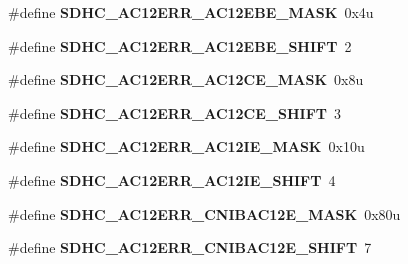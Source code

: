 \begin{DoxyCompactItemize}
\item 
\#define {\bfseries S\+D\+H\+C\+\_\+\+A\+C12\+E\+R\+R\+\_\+\+A\+C12\+E\+B\+E\+\_\+\+M\+A\+SK}~0x4u\hypertarget{group__SDHC__Register__Masks_ga20a7d6558b259a61499a0745f6450798}{}\label{group__SDHC__Register__Masks_ga20a7d6558b259a61499a0745f6450798}

\item 
\#define {\bfseries S\+D\+H\+C\+\_\+\+A\+C12\+E\+R\+R\+\_\+\+A\+C12\+E\+B\+E\+\_\+\+S\+H\+I\+FT}~2\hypertarget{group__SDHC__Register__Masks_gaa4872fca1b2f1ae350fcb6297e995469}{}\label{group__SDHC__Register__Masks_gaa4872fca1b2f1ae350fcb6297e995469}

\item 
\#define {\bfseries S\+D\+H\+C\+\_\+\+A\+C12\+E\+R\+R\+\_\+\+A\+C12\+C\+E\+\_\+\+M\+A\+SK}~0x8u\hypertarget{group__SDHC__Register__Masks_gabefbec3e963ccb70de1fdc5b0bb06c14}{}\label{group__SDHC__Register__Masks_gabefbec3e963ccb70de1fdc5b0bb06c14}

\item 
\#define {\bfseries S\+D\+H\+C\+\_\+\+A\+C12\+E\+R\+R\+\_\+\+A\+C12\+C\+E\+\_\+\+S\+H\+I\+FT}~3\hypertarget{group__SDHC__Register__Masks_ga7b92a5f04788ce2cc5634ebf7f604a9b}{}\label{group__SDHC__Register__Masks_ga7b92a5f04788ce2cc5634ebf7f604a9b}

\item 
\#define {\bfseries S\+D\+H\+C\+\_\+\+A\+C12\+E\+R\+R\+\_\+\+A\+C12\+I\+E\+\_\+\+M\+A\+SK}~0x10u\hypertarget{group__SDHC__Register__Masks_ga83739f9ba43d7cded35950a1e98d2caa}{}\label{group__SDHC__Register__Masks_ga83739f9ba43d7cded35950a1e98d2caa}

\item 
\#define {\bfseries S\+D\+H\+C\+\_\+\+A\+C12\+E\+R\+R\+\_\+\+A\+C12\+I\+E\+\_\+\+S\+H\+I\+FT}~4\hypertarget{group__SDHC__Register__Masks_ga3bd5a3ae0633a0ab02becdb7422fa910}{}\label{group__SDHC__Register__Masks_ga3bd5a3ae0633a0ab02becdb7422fa910}

\item 
\#define {\bfseries S\+D\+H\+C\+\_\+\+A\+C12\+E\+R\+R\+\_\+\+C\+N\+I\+B\+A\+C12\+E\+\_\+\+M\+A\+SK}~0x80u\hypertarget{group__SDHC__Register__Masks_gad096f631b95fe669726629c2c1f3fbee}{}\label{group__SDHC__Register__Masks_gad096f631b95fe669726629c2c1f3fbee}

\item 
\#define {\bfseries S\+D\+H\+C\+\_\+\+A\+C12\+E\+R\+R\+\_\+\+C\+N\+I\+B\+A\+C12\+E\+\_\+\+S\+H\+I\+FT}~7\hypertarget{group__SDHC__Register__Masks_gaa5735a7d405c4f7841b2f62c9a3cc841}{}\label{group__SDHC__Register__Masks_gaa5735a7d405c4f7841b2f62c9a3cc841}


\end{DoxyCompactItemize}
